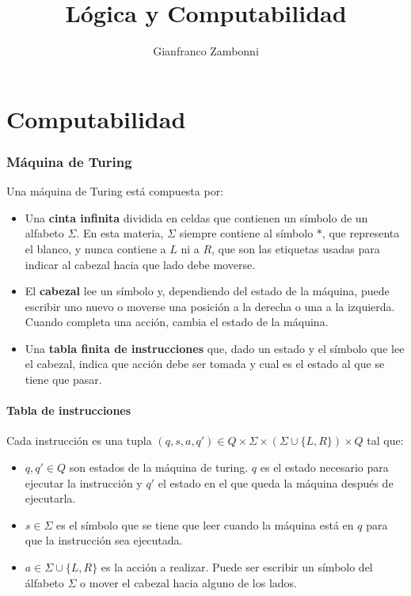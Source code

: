 

\title{Lógica y Computabilidad}
\author{Gianfranco Zambonni}







	
	\maketitle
	\tableofcontents
	\newpage
	
	\part{Computabilidad}
	
	\section{Máquina de Turing}
	Una máquina de Turing está compuesta por:

	\begin{itemize}
		\item Una \textbf{cinta infinita}  dividida en celdas que contienen un símbolo de un alfabeto $\Sigma$. En esta materia, $\Sigma$ siempre contiene al símbolo $*$, que representa el blanco, y nunca contiene a $L$ ni a $R$, que son las etiquetas usadas para indicar al cabezal hacia que lado debe moverse.
		\item El \textbf{cabezal} lee un símbolo y, dependiendo del estado de la máquina, puede escribir uno nuevo o moverse una posición a la derecha o una a la izquierda. Cuando completa una acción, cambia el estado de la máquina.
		\item Una \textbf{tabla finita de instrucciones} que, dado un estado y el símbolo que lee el cabezal, indica que acción debe ser tomada y cual es el estado al que se tiene que pasar.
	\end{itemize}

	\subsection{Tabla de instrucciones}
	Cada instrucción es una tupla $(q,s,a,q')\in Q\times\Sigma\times (\Sigma\cup \{L,R\}) \times Q$ tal que:
	\begin{itemize}
		\item $q,q'\in Q$ son estados de la máquina de turing. $q$ es el estado necesario para ejecutar la instrucción y $q'$ el estado en el que queda la máquina después de ejecutarla.
		\item $s\in\Sigma$ es el símbolo que se tiene que leer cuando la máquina está en $q$ para que la instrucción sea ejecutada.
		\item $a\in\Sigma\cup \{L,R\}$ es la acción a realizar. Puede ser escribir un símbolo del álfabeto $\Sigma$ o mover el cabezal hacia alguno de los lados.
	\end{itemize}

